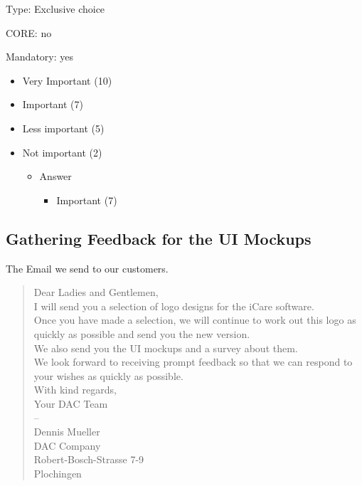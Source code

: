 Type: Exclusive choice 

CORE: no

Mandatory: yes 

\begin{itemize}
	\item Very Important (10)
	\item Important (7)
	\item Less important (5)
	\item Not important (2)
	
	\begin{itemize}
		\item Answer
		\begin{itemize}
			\item Important (7)
		\end{itemize}
	\end{itemize}
\end{itemize}


\subsection{Gathering Feedback for the UI Mockups}
\label{sec:orgab0c9bc}
The Email we send to our customers.
\begin{verse}
	\vspace*{1em}
   Dear Ladies and Gentlemen,\\
	\vspace*{1em}
	\vspace*{1em}
	I will send you a selection of logo designs for the iCare software.\\
	Once you have made a selection, we will continue to work out this logo as quickly as possible and send you the new version.\\
	\vspace*{1em}
	We also send you the UI mockups and a survey about them.\\
	\vspace*{1em}
	We look forward to receiving prompt feedback so that we can respond to your wishes as quickly as possible.\\
	\vspace*{1em}
	With kind regards,\\
	Your DAC Team\\
	--\\
	Dennis Mueller\\
	\vspace*{1em}
	DAC Company\\
	Robert-Bosch-Strasse 7-9\\
	Plochingen\\
\end{verse}



